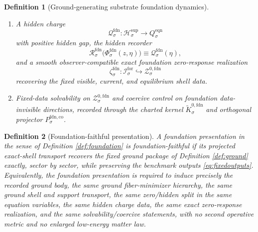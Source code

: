\documentclass[11pt]{article}
\newcommand{\ForSpace}[1]{\mathcal I_{#1}^{\mathrm{for}}}
\newcommand{\FoundSupportShell}[1]{\mathcal Z_{#1}^{\mathrm{fdn,sup}}}
\newcommand{\FoundZeroCore}[1]{\mathcal Z_{#1}^{0,\mathrm{fdn}}}
\newcommand{\FoundZeroChart}[1]{\Psi_{#1}^{0,\mathrm{fdn}}}
\newcommand{\FoundSplit}[1]{\Phi_{#1}^{\mathrm{fdn}}}
\newcommand{\FoundCharge}[1]{\mathcal Q_{#1}^{\mathrm{fdn}}}
\newcommand{\FoundResidual}[1]{\mathcal R_{#1}^{\mathrm{fdn}}}
\newcommand{\FoundEmbed}[1]{\zeta_{#1}^{\mathrm{fdn}}}
\newcommand{\FoundKernelCh}[1]{\widetilde K_{#1}^{0,\mathrm{fdn}}}
\newcommand{\FoundStateComp}[1]{P_{#1}^{\mathrm{fdn,co}}}
\newcommand{\SeedHidden}[1]{\mathcal H_{#1}^{\mathrm{sup}}}
\newcommand{\SeedHiddenBody}[1]{D_{#1}^{\mathrm{sup}}}
\newcommand{\EqnTarget}[1]{Q_{#1}^{\mathrm{eqn}}}
\newcommand{\EqnZero}[1]{V_{#1}^{\mathrm{eqn},0}}
\newtheorem{definition}{Definition}
\begin{document}
\begin{definition}[Ground-generating substrate foundation dynamics]
\begin{enumerate}
\[    \]
    a zero chart
    \[
    \FoundZeroChart{\sigma}:\FoundZeroCore{\sigma}\to\EqnZero{\sigma},
    \]
    and a diffeomorphism
    \[
    \FoundSplit{\sigma}:
    \FoundZeroCore{\sigma}\times\SeedHiddenBody{\sigma}
    \xrightarrow{\cong}
    \FoundSupportShell{\sigma}
    \]
    obeying the same zero/hidden split in the same equation variables.
    \item A hidden charge
    \[
    \FoundCharge{\sigma}:\SeedHidden{\sigma}\to\EqnTarget{\sigma}
    \]
    with positive hidden gap, the hidden recorder
    \[
    \FoundResidual{\sigma}\bigl(\FoundSplit{\sigma}(z,\eta)\bigr)
    \equiv
    \FoundCharge{\sigma}(\eta),
    \]
    and a smooth observer-compatible exact foundation zero-response realization
    \[
    \FoundEmbed{\sigma}:\ForSpace{\sigma}\hookrightarrow\FoundZeroCore{\sigma}
    \]
    recovering the fixed visible, current, and equilibrium shell data.
    \item Fixed-data solvability on \(\FoundZeroCore{\sigma}\) and coercive control on foundation data-invisible directions, recorded through the charted kernel \(\FoundKernelCh{\sigma}\) and orthogonal projector \(\FoundStateComp{\sigma}\).
\end{enumerate}
\end{definition}

\begin{definition}[Foundation-faithful presentation]
\label{def:faithful}
A foundation presentation in the sense of Definition \ref{def:foundation} is \emph{foundation-faithful} if its projected exact-shell transport recovers the fixed ground package of Definition \ref{def:ground} exactly, sector by sector, while preserving the benchmark outputs \eqref{eq:fixedoutputs}. Equivalently, the foundation presentation is required to induce precisely the recorded ground body, the same ground fiber-minimizer hierarchy, the same ground shell and support transport, the same zero/hidden split in the same equation variables, the same hidden charge data, the same exact zero-response realization, and the same solvability/coercive statements, with no second operative metric and no enlarged low-energy matter law.
\end{definition}
\end{document}
